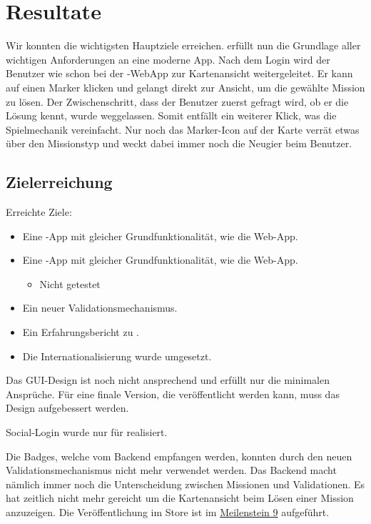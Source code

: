 \chapter{Resultate}
\label{tb-resultate}

Wir konnten die wichtigsten Hauptziele erreichen.
\kort{} erfüllt nun die Grundlage aller wichtigen Anforderungen an eine moderne App.
Nach dem Login wird der Benutzer wie schon bei der \kort{}-\gls{WebApp} zur Kartenansicht weitergeleitet.
Er kann auf einen Marker klicken und gelangt direkt zur Ansicht, um die gewählte Mission zu lösen.
Der Zwischenschritt, dass der Benutzer zuerst gefragt wird, ob er die Lösung kennt, wurde weggelassen.
Somit entfällt ein weiterer Klick, was die Spielmechanik vereinfacht.
Nur noch das Marker-Icon auf der Karte verrät etwas über den Missionstyp und weckt dabei immer noch die Neugier beim Benutzer.


\section{Zielerreichung}

Erreichte Ziele:
\begin{itemize}
	\item Eine -App mit gleicher Grundfunktionalität, wie die Web-App.
	\item Eine -App mit gleicher Grundfunktionalität, wie die Web-App.
	\begin{itemize}
		\item Nicht getestet
	\end{itemize}
	\item Ein neuer Validationsmechanismus.
	\item Ein Erfahrungsbericht zu .
	\item Die Internationalisierung wurde umgesetzt.
\end{itemize}

Das \gls{GUI}-Design ist noch nicht ansprechend und erfüllt nur die minimalen Ansprüche.
Für eine finale Version, die veröffentlicht werden kann, muss das Design aufgebessert werden. 

Social-Login wurde nur für  realisiert.

Die Badges, welche vom \gls{Backend} empfangen werden, konnten durch den neuen Validationsmechanismus nicht mehr verwendet werden.
Das Backend macht nämlich immer noch die Unterscheidung zwischen Missionen und Validationen.
Es hat zeitlich nicht mehr gereicht um die Kartenansicht beim Lösen einer Mission anzuzeigen.
Die Veröffentlichung im  Store ist im \hyperref[pm-ms9]{Meilenstein 9} aufgeführt.

